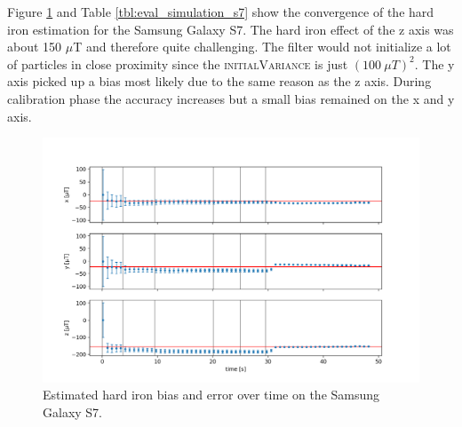 Figure \ref{fig:eval_simulation_s7} and Table \ref{tbl:eval_simulation_s7} show the convergence of the hard iron estimation for the Samsung Galaxy S7. The hard iron effect of the z axis was about 150 $\mu$T and therefore quite challenging. The filter would not initialize a lot of particles in close proximity since the \textsc{initialVariance} is just $(100\ \mu T)^2$. The y axis picked up a bias most likely due to the same reason as the z axis. During calibration phase the accuracy increases but a small bias remained on the x and y axis.

\begin{figure}[H]
    \centering
    \includegraphics[width=1.0\textwidth]{figures/convergence_s7.png}
    \caption{Estimated hard iron bias and error over time on the Samsung Galaxy S7.}
    \label{fig:eval_simulation_s7}
\end{figure}

